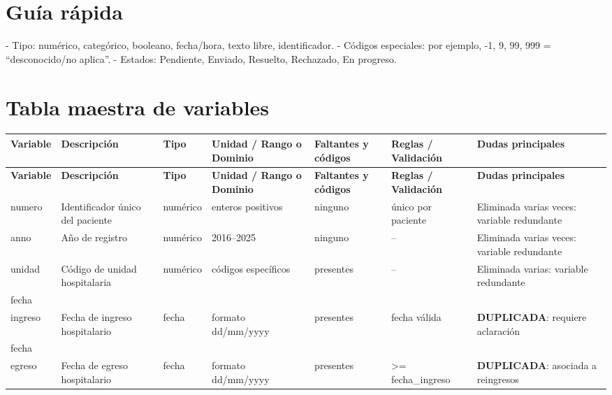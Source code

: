 \documentclass[11pt,a4paper]{article}
\renewcommand{\arraystretch}{1.2}
\begin{document}
\section*{Guía rápida}
- Tipo: numérico, categórico, booleano, fecha/hora, texto libre, identificador. 
- Códigos especiales: por ejemplo, -1, 9, 99, 999 = “desconocido/no aplica”. 
- Estados: Pendiente, Enviado, Resuelto, Rechazado, En progreso.

\section{Tabla maestra de variables}
\scriptsize
\setlength{\LTleft}{-1cm}
\setlength{\LTright}{-1cm}
\setlength{\tabcolsep}{1.5pt}
\renewcommand{\arraystretch}{1.15}
\begin{longtable}{@{}L{0.095\textwidth} L{0.17\textwidth} L{0.07\textwidth} L{0.16\textwidth} L{0.14\textwidth} L{0.13\textwidth} L{0.15\textwidth}@{}}
\toprule
\textbf{Variable} & \textbf{Descripción} & \textbf{Tipo} & \textbf{Unidad / Rango o Dominio} & \textbf{Faltantes y códigos} & \textbf{Reglas / Validación} & \textbf{Dudas principales} \\
\midrule
\endfirsthead
\toprule
\textbf{Variable} & \textbf{Descripción} & \textbf{Tipo} & \textbf{Unidad / Rango o Dominio} & \textbf{Faltantes y códigos} & \textbf{Reglas / Validación} & \textbf{Dudas principales} \\
\midrule
\endhead
numero & Identificador único del paciente & numérico & enteros positivos & ninguno & único por paciente & Eliminada varias veces: variable redundante \\
anno & Año de registro & numérico & 2016--2025 & ninguno & -- & Eliminada varias veces: variable redundante \\
unidad & Código de unidad hospitalaria & numérico & códigos específicos & presentes & -- & Eliminada varias: variable redundante \\
fecha\\ingreso & Fecha de ingreso hospitalario & fecha & formato dd/mm/yyyy & presentes & fecha válida & \textbf{DUPLICADA}: requiere aclaración \\
fecha\\egreso & Fecha de egreso hospitalario & fecha & formato dd/mm/yyyy & presentes & >= fecha\_ingreso & \textbf{DUPLICADA}: asociada a reingresos \\

\end{longtable}
\end{document}
